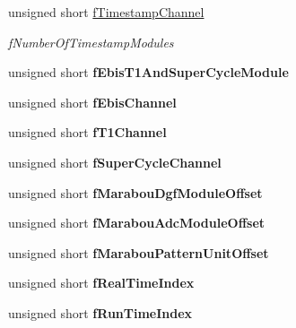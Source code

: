 \begin{DoxyCompactItemize}
unsigned short \hyperlink{class_global_settings_abc63389c34c21eba6a25723442e825a2}{f\+Timestamp\+Channel}
\begin{DoxyCompactList}\small\item\em f\+Number\+Of\+Timestamp\+Modules \end{DoxyCompactList}\item 
\mbox{\label{class_global_settings_a0f85aaa3aa19f24ab7b3b029feb19e89}} 
unsigned short {\bfseries f\+Ebis\+T1\+And\+Super\+Cycle\+Module}
\item 
\mbox{\label{class_global_settings_a1e0af52a3df16678c85730eb93eec4b8}} 
unsigned short {\bfseries f\+Ebis\+Channel}
\item 
\mbox{\label{class_global_settings_a8342c6229c94c09f5cd7cb57c69227f1}} 
unsigned short {\bfseries f\+T1\+Channel}
\item 
\mbox{\label{class_global_settings_a151bdb446baeac778c83c3df8ff97c71}} 
unsigned short {\bfseries f\+Super\+Cycle\+Channel}
\item 
\mbox{\label{class_global_settings_ae4982fffd750facbbe9562801711b25f}} 
unsigned short {\bfseries f\+Marabou\+Dgf\+Module\+Offset}
\item 
\mbox{\label{class_global_settings_acf1502561adce6da14a91b9b90f4d0fc}} 
unsigned short {\bfseries f\+Marabou\+Adc\+Module\+Offset}
\item 
\mbox{\label{class_global_settings_a1275e401d46401ca89fc32e293642415}} 
unsigned short {\bfseries f\+Marabou\+Pattern\+Unit\+Offset}
\item 
\mbox{\label{class_global_settings_a142b843d3d046e74845672a8177c9de1}} 
unsigned short {\bfseries f\+Real\+Time\+Index}
\item 
\mbox{\label{class_global_settings_afcd06d4313aede9d4d55fde8c90a6d7f}} 
unsigned short {\bfseries f\+Run\+Time\+Index}
\item 
\mbox{\label{class_global_settings_af6209578839870c7608b5cecbcfc0bd8}} 

\end{DoxyCompactItemize}
